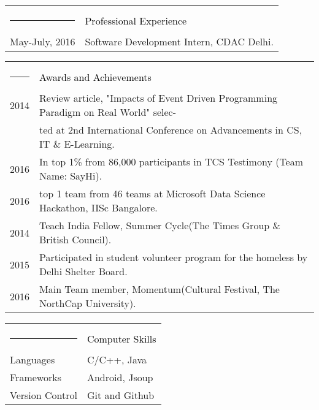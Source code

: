 \documentclass[12pt]{article}
\begin{document}
	
	
	\begin{tabular}{ll}{\hspace{10em}}\\
		\textcolor{lightgray}{\rule{2.7cm}{4pt}} & \textcolor{black}{\LARGE{Professional Experience}}\\
		\textmd{May-July, 2016} & \textmd{
			Software Development Intern, CDAC Delhi.}
	\end{tabular}
	
	\begin{tabular}{ll}{\hspace{10em}}\\
		\textcolor{lightgray}{\rule{2.7cm}{4pt}} & \textcolor{black}{\LARGE{Awards and Achievements}}\\
		\textmd{2014} & \textmd{Review article, "Impacts of Event Driven Programming Paradigm on Real World" selec-}\\
		\textmd{} & \textmd{ted at 2nd International Conference on Advancements in CS, IT \& E-Learning.}\\
		\textmd{2016} & \textmd{In top 1\% from 86,000 participants in TCS Testimony (Team Name: SayHi). }\\
		\textmd{2016} & \textmd{top 1 team from 46 teams at Microsoft Data Science Hackathon, IISc Bangalore.}\\
		\textmd{2014} & \textmd{Teach India Fellow, Summer Cycle(The Times Group \& British Council).}\\
		\textmd{2015} & \textmd{Participated in student volunteer program for the homeless by Delhi Shelter Board.}\\
		\textmd{2016} & \textmd{Main Team member, Momentum(Cultural Festival, The NorthCap University).}\\
	\end{tabular}

    \begin{tabular}{ll}{\hspace{10em}}\\
    	\textcolor{lightgray}{\rule{2.7cm}{4pt}} & \textcolor{black}{\LARGE{Computer Skills}}\\
    	\textmd{Languages} & \textmd{C/C++, Java}\\
    	\textmd{Frameworks} & \textmd{Android, Jsoup}\\
    	\textmd{Version Control} & \textmd{Git and Github}\\
    \end{tabular}
\end{document}
